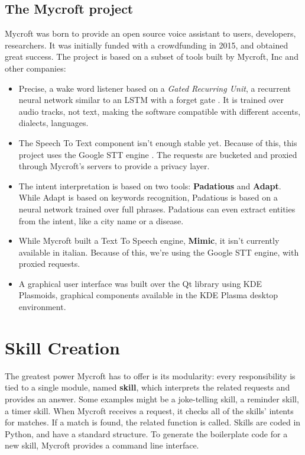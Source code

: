 \documentclass[conference]{IEEEtran}
\begin{document}
\subsection{The Mycroft project}
Mycroft was born to provide an open source voice assistant to users, developers, researchers.\cite{mycroft} It was initially funded with a crowdfunding in 2015, and obtained great success. The project is based on a subset of tools built by Mycroft, Inc and other companies:
\begin{itemize}
    \item Precise, a wake word listener based on a \textit{Gated Recurring Unit}, a recurrent neural network similar to an LSTM with a forget gate \cite{GRU}. It is trained over audio tracks, not text, making the software compatible with different accents, dialects, languages.
    \item The Speech To Text component isn't enough stable yet. Because of this, this project uses the Google STT engine \cite{google-stt}. The requests are bucketed and proxied through Mycroft's servers to provide a privacy layer.
    \item The intent interpretation is based on two tools: \textbf{Padatious} and \textbf{Adapt}. While Adapt is based on keywords recognition, Padatious is based on a neural network trained over full phrases. Padatious can even extract entities from the intent, like a city name or a disease.
    \item While Mycroft built a Text To Speech engine, \textbf{Mimic}, it isn't currently available in italian. Because of this, we're using the Google STT engine, with proxied requests.
    \item A graphical user interface was built over the Qt library using KDE Plasmoids, graphical components available in the KDE Plasma desktop environment.
\end{itemize}
\section{Skill Creation}
\label{sec:skill-creation}
The greatest power Mycroft has to offer is its modularity: every responsibility is tied to a single module, named \textbf{skill}, which interprets the related requests and provides an answer. Some examples might be a joke-telling skill, a reminder skill, a timer skill. When Mycroft receives a request, it checks all of the skills' intents for matches. If a match is found, the related function is called.
Skills are coded in Python, and have a standard structure. To generate the boilerplate code for a new skill, Mycroft provides a command line interface.
\end{document}
